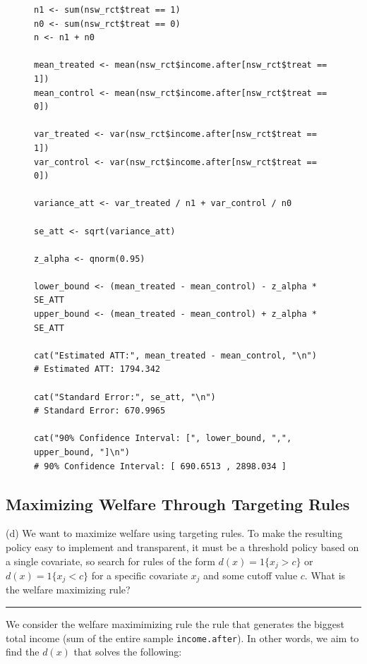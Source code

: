 \documentclass{article}
\newenvironment{colorparagraph}[1]{\par\color{#1}}{\par}
\begin{document}
\begin{figure}[H]
\centering
\begin{lstlisting}[style=Rstyle, caption=90\% Confidence Interval]
n1 <- sum(nsw_rct$treat == 1)
n0 <- sum(nsw_rct$treat == 0)
n <- n1 + n0

mean_treated <- mean(nsw_rct$income.after[nsw_rct$treat == 1])
mean_control <- mean(nsw_rct$income.after[nsw_rct$treat == 0])

var_treated <- var(nsw_rct$income.after[nsw_rct$treat == 1])
var_control <- var(nsw_rct$income.after[nsw_rct$treat == 0])

variance_att <- var_treated / n1 + var_control / n0

se_att <- sqrt(variance_att)

z_alpha <- qnorm(0.95)

lower_bound <- (mean_treated - mean_control) - z_alpha * SE_ATT
upper_bound <- (mean_treated - mean_control) + z_alpha * SE_ATT

cat("Estimated ATT:", mean_treated - mean_control, "\n")
# Estimated ATT: 1794.342 

cat("Standard Error:", se_att, "\n")
# Standard Error: 670.9965

cat("90% Confidence Interval: [", lower_bound, ",", upper_bound, "]\n")
# 90% Confidence Interval: [ 690.6513 , 2898.034 ]
\end{lstlisting}
\end{figure}

\begin{colorparagraph}{questioncolor}
\label{q4d}\subsection{Maximizing Welfare Through Targeting Rules}
(d) We want to maximize welfare using targeting rules. To make the resulting policy easy to implement and transparent, it must be a threshold policy based on a single covariate, so search for rules of the form \( d(x) = 1\{x_j > c\} \) or \( d(x) = 1\{x_j < c\} \) for a specific covariate \( x_j \) and some cutoff value \( c \). What is the welfare maximizing rule?

\rule{\textwidth}{0.5pt}
\end{colorparagraph}

We consider the welfare maximimizing rule the rule that generates the biggest total income (sum of the entire sample \texttt{income.after}). In other words, we aim to find the $d(x)$ that solves the following:
\end{document}
